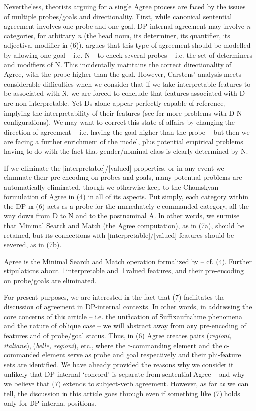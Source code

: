 \documentclass[output=paper]{langsci/langscibook}
\begin{document}
Nevertheless, theorists arguing for a single Agree process are faced by the issues of multiple probes/goals and directionality. First, while canonical sentential agreement involves one probe and one goal, DP-internal agreement may involve \textit{n} categories, for arbitrary \textit{n} (the head noun, its determiner, its quantifier, its adjectival modifier in (6)). \citet{Carstens2001} argues that this type of agreement should be modelled by allowing one goal – i.e. N – to check several probes – i.e. the set of determiners and modifiers of N. This incidentally maintains the correct directionality of Agree, with the probe higher than the goal. However, Carstens’ analysis meets considerable difficulties when we consider that if we take interpretable features to be associated with N, we are forced to conclude that features associated with D are non-interpretable. Yet Ds alone appear perfectly capable of reference, implying the interpretability of their features (see \citealt{Danon2010} for more problems with D-N configurations). We may want to correct this state of affairs by changing the direction of agreement – i.e. having the goal higher than the probe – but then we are facing a further enrichment of the model, plus potential empirical problems having to do with the fact that gender/nominal class is clearly determined by N.

If we eliminate the [interpretable]/[valued] properties, or in any event we eliminate their pre-encoding on probes and goals, many potential problems are automatically eliminated, though we otherwise keep to the Chomskyan formulation of Agree in (4) in all of its aspects. Put simply, each category within the DP in (6) acts as a probe for the immediately c-commanded category, all the way down from D to N and to the postnominal A. In other words, we surmise that Minimal Search and Match (the Agree computation), as in (7a), should be retained, but its connections with [interpretable]/[valued] features should be severed, as in (7b). 

\ea%
    \label{ex:manzini:7}
    \ea Agree is the Minimal Search and Match operation formalized by \citet{Chomsky2000} – cf. (4). 
    \ex Further stipulations about ±interpretable and ±valued features, and their pre-encoding on probe/goals \citep{Chomsky2001} are eliminated.  
    \z
\z


For present purposes, we are interested in the fact that (7) facilitates the discussion of agreement in DP-internal contexts. In other words, in addressing the core concerns of this article – i.e. the unification of Suffixaufnahme phenomena and the nature of oblique case – we will abstract away from any pre-encoding of features and of probe/goal status. Thus, in (6) Agree creates pairs (\textit{regioni, italiane}), (\textit{belle, regioni}), etc., where the c-commanding element and the c-commanded element serve as probe and goal respectively and their phi-feature sets are identified. We have already provided the reasons why we consider it unlikely that DP-internal ‘concord’ is separate from sentential Agree – and why we believe that (7) extends to subject-verb agreement. However, as far as we can tell, the discussion in this article goes through even if something like (7) holds only for DP-internal positions. 
\end{document}
